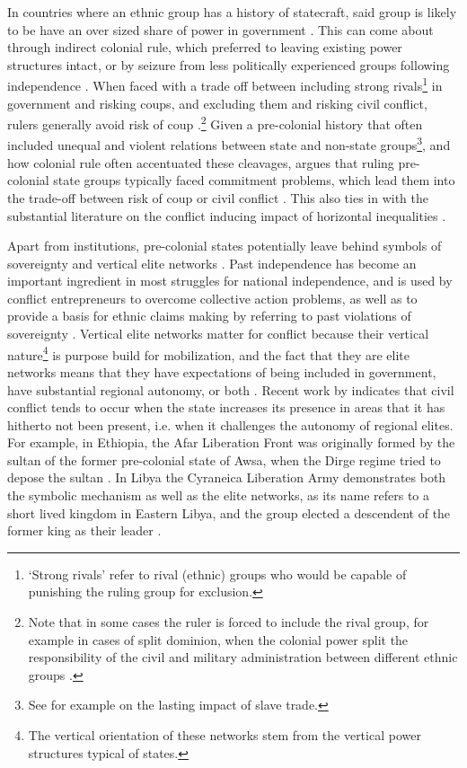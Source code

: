 \documentclass[12pt]{article}
\begin{document}
In countries where an ethnic group has a history of statecraft, said group is
likely to be have an over sized share of power in government
\citep{Wucherpfennig2016}. This can come about through indirect colonial rule,
which preferred to leaving existing power structures intact, or by seizure from
less politically experienced groups following independence \citep{Paine2019}.
When faced with a trade off between including strong rivals\footnote{`Strong
	rivals' refer to rival (ethnic) groups who would be capable of punishing
	the ruling group for exclusion.} in government and risking coups, and
	excluding them and risking civil conflict, rulers generally avoid risk
	of coup \citep{Paine2019, Powell_2014, Roessler_2011}.\footnote{Note
		that in some cases the ruler is forced to include the rival
		group, for example in cases of split dominion, when the colonial
		power split the responsibility of the civil and military
		administration between different ethnic groups
		\citep{Paine2019}.} Given a pre-colonial history that often
		included unequal and violent relations between state and
		non-state groups\footnote{See for example \citet{Nunn2008} on
		the lasting impact of slave trade.}, and how colonial rule often
		accentuated these cleavages, \citet{Paine2019} argues that
		ruling pre-colonial state groups typically faced commitment
		problems, which lead them into the trade-off between risk of
		coup or civil conflict \citep{Paine2019}. This also ties in with
		the substantial literature on the conflict inducing impact of
		horizontal inequalities \citep{CEDERMAN_2011}.

Apart from institutions, pre-colonial states potentially leave behind symbols of
sovereignty and vertical elite networks \citep{Wishman}. Past independence has
become an important ingredient in most struggles for national independence, and
is used by conflict entrepreneurs to overcome collective action problems, as
well as to provide a basis for ethnic claims making by referring to past
violations of sovereignty \citep{Ahram2019, Shelef2016}. Vertical elite networks
matter for conflict because their vertical nature\footnote{The vertical
orientation of these networks stem from the vertical power structures typical of
states.} is purpose build for mobilization, and the fact that they are elite
networks means that they have expectations of being included in government, have
substantial regional autonomy, or both \citep{Wishman}. Recent work by
\citet{Ying_2020} indicates that civil conflict tends to occur when the state
increases its presence in areas that it has hitherto not been present, i.e. when
it challenges the autonomy of regional elites. For example, in Ethiopia, the
Afar Liberation Front was originally formed by the sultan of the former
pre-colonial state of Awsa, when the Dirge regime tried to depose the sultan
\citep{Shehim1985, Hanfare2011}.  In Libya the Cyraneica Liberation Army
demonstrates both the symbolic mechanism as well as the elite networks, as its
name refers to a short lived kingdom in Eastern Libya, and the group elected a
descendent of the former king as their leader \citep{Ahram2019}.
\end{document}

